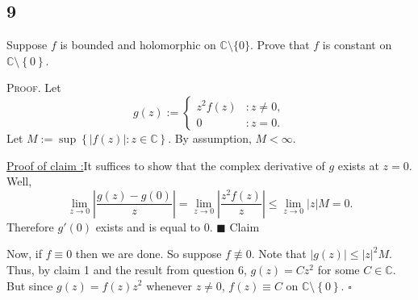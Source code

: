 \documentclass[12pt]{article}
\newcounter{ProofCounter}
\newcounter{ClaimCounter}[ProofCounter]
\newenvironment{Proof}{\stepcounter{ProofCounter}\textsc{Proof.}}{\hfill$\square$}
\newenvironment{claim}[1]{\vspace{1mm}\stepcounter{ClaimCounter}\par\noindent\underline{\bf Claim \theClaimCounter:}\space#1}{}
\newenvironment{claimproof}[1]{\par\noindent\underline{Proof of claim \theClaimCounter:}\space#1}{\hfill $\blacksquare$ Claim \theClaimCounter}
\begin{document}
\newpage 
\subsection*{9}
\begin{tcolorbox}
Suppose $f$ is bounded and holomorphic on $\mathbb{C}\setminus \{0\}$. Prove that $f$ is constant on $\mathbb{C}\setminus\left\{ 0 \right\}$.
\end{tcolorbox}
\begin{Proof}
Let 
\[ g(z) := \left\{ \begin{array}{cl}
z^{2}f(z) & : z \neq 0, \\
0 & : z = 0. 
\end{array} \right. \]
Let $M := \sup\left\{ |f(z)| : z \in \mathbb{C} \right\}$. By assumption, $M < \infty$.
\begin{claimproof}
It suffices to show that the complex derivative of $g$ exists at $z = 0$. Well, 
\[ \lim_{z\rightarrow 0}\left|\frac{g(z) - g(0)}{z}\right|  = \lim_{z\rightarrow 0}\left|\frac{z^{2}f(z)}{z}\right| 
\leq \lim_{z\rightarrow 0} |z|M = 0. \]
Therefore $g'(0)$ exists and is equal to 0.
\end{claimproof}

Now, if $f \equiv 0$ then we are done. So suppose $f \not\equiv 0$. Note that $|g(z)| \leq |z|^{2}M$. Thus, by claim 1 and the result from question 6,
$g(z) = Cz^{2}$ for some $C \in \mathbb{C}$. But since $g(z) = f(z)z^{2}$ whenever $z \neq 0$, $f(z) \equiv C$ on $\mathbb{C}\setminus \left\{ 0
\right\}$.
\end{Proof}


\newpage 
\end{document}
